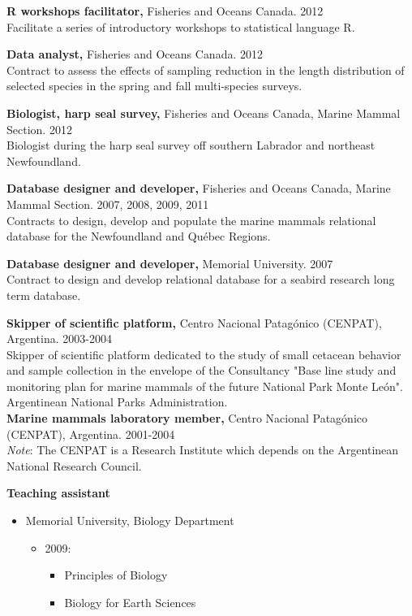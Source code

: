\documentclass{res}
\begin{document}
\begin{resume}
\textbf{R workshops facilitator,} Fisheries and Oceans Canada. 2012\\
Facilitate a series of introductory workshops to statistical language R.

\textbf{Data analyst,} Fisheries and Oceans Canada. 2012\\
Contract to assess the effects of sampling reduction in the length distribution of selected species in the spring and fall multi-species surveys. 

\textbf{Biologist, harp seal survey,} Fisheries and Oceans Canada, Marine Mammal Section. 2012\\
Biologist during the harp seal survey off southern Labrador and northeast Newfoundland.

\textbf{Database designer and developer,} Fisheries and Oceans Canada, Marine Mammal Section. 2007, 2008, 2009, 2011\\
Contracts to design, develop and populate the marine mammals relational database for the Newfoundland and Qu\'{e}bec Regions. 

\textbf{Database designer and developer,} Memorial University. 2007\\
Contract to design and develop relational database for a seabird research long term database. 

\textbf{Skipper of scientific platform,} Centro Nacional Patag\'{o}nico (CENPAT), Argentina. 2003-2004\\
Skipper of scientific platform dedicated to the study of small cetacean behavior and sample collection in the envelope of the Consultancy "Base line study and monitoring plan for marine mammals of the future National Park Monte Le\'{o}n". Argentinean National Parks Administration.\\

\textbf{Marine mammals laboratory member,} Centro Nacional Patag\'{o}nico (CENPAT), Argentina. 2001-2004\\

\textit{Note}: The CENPAT is a Research Institute which depends on the Argentinean National Research Council.

\textbf{Teaching assistant}
\begin{itemize}
	\item[] Memorial University, Biology Department
	\begin{itemize}
		\item[] 2009:
		\begin{itemize}
			\item[] Principles of Biology
			\item[] Biology for Earth Sciences
		\end{itemize}
	\end{itemize} 


\end{itemize}
\end{resume}
\end{document}
